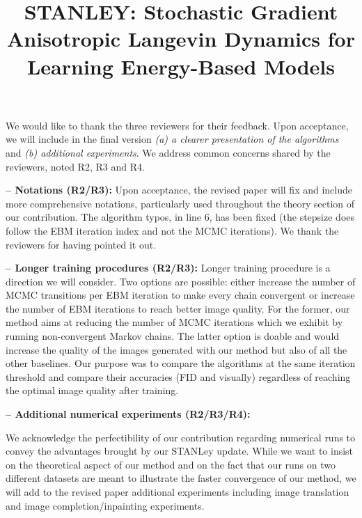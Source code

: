 \documentclass[10pt,twocolumn,letterpaper]{article}
\begin{document}
\title{STANLEY: Stochastic Gradient Anisotropic Langevin Dynamics for Learning Energy-Based Models}  %

\maketitle
\thispagestyle{empty}



We would like to thank the three reviewers for their feedback. 
Upon acceptance, we will include in the final version \emph{{\sf (a)} a clearer presentation of the algorithms} and \emph{{\sf (b)} additional experiments}. 
We address common concerns shared by the reviewers, noted R2, R3 and R4.

\noindent  \textbf{-- Notations (R2/R3):}
Upon acceptance, the revised paper will fix and include more comprehensive notations, particularly used throughout the theory section of our contribution.
The algorithm typos, in line 6, has been fixed (the stepsize does follow the EBM iteration index and not the MCMC iterations). We thank the reviewers for having pointed it out.

\noindent \textbf{-- Longer training procedures (R2/R3):}
Longer training procedure is a direction we will consider. 
Two options are possible: either increase the number of MCMC transitions per EBM iteration to make every chain convergent or increase the number of EBM iterations to reach better image quality.
For the former, our method aims at reducing the number of MCMC iterations which we exhibit by running non-convergent Markov chains. 
The latter option is doable and would increase the quality of the images generated with our method but also of all the other baselines.
Our purpose was to compare the algorithms at the same iteration threshold and compare their accuracies (FID and visually) regardless of reaching the optimal image quality after training.


\noindent \textbf{-- Additional numerical experiments (R2/R3/R4):}

We acknowledge the perfectibility of our contribution regarding numerical runs to convey the advantages brought by our STANLey update.
While we want to insist on the theoretical aspect of our method and on the fact that our runs on two different datasets are meant to illustrate the faster convergence of our method, we will add to the revised paper additional experiments including image translation and image completion/inpainting experiments.
\end{document}
